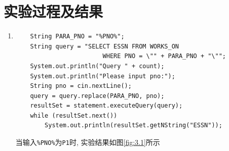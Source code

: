 \documentclass{ML}
\begin{document}
\section{实验过程及结果}
\begin{enumerate}
    \item \begin{verbatim}
    String PARA_PNO = "%PNO%";
    String query = "SELECT ESSN FROM WORKS_ON 
                        WHERE PNO = \"" + PARA_PNO + "\"";
    System.out.println("Query " + count);
    System.out.println("Please input pno:");
    String pno = cin.nextLine();
    query = query.replace(PARA_PNO, pno);
    resultSet = statement.executeQuery(query);
    while (resultSet.next())
        System.out.println(resultSet.getNString("ESSN"));
    \end{verbatim}
    当输入\texttt{\%PNO\%}为\texttt{P1}时, 实验结果如图\ref{fig:3.1}所示
    \begin{figure}[H]
        \centering

\end{figure}
\end{enumerate}
\end{document}
